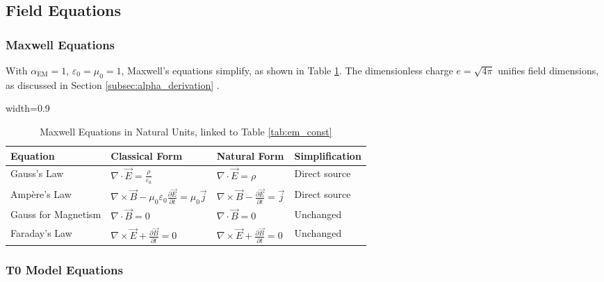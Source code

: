 \documentclass[12pt,a4paper]{article}
\newcommand{\alphaEM}{\alpha_{\text{EM}}}
\newcommand{\tablescale}{0.9}
\begin{document}
	\subsection{Field Equations}
	\label{sec:field_equations}
	
	\subsubsection{Maxwell Equations}
	\label{subsec:maxwell}
	
	With \(\alphaEM = 1\), \(\varepsilon_0 = \mu_0 = 1\), Maxwell’s equations simplify, as shown in Table \ref{tab:maxwell}. The dimensionless charge \(e = \sqrt{4\pi}\) unifies field dimensions, as discussed in Section \ref{subsec:alpha_derivation} \cite{pascher_alpha_2025}.
	
	\begin{table}[htbp]
		\centering
		\begin{adjustbox}{width=\tablescale\textwidth}
			\begin{tabular}{llll}
				\toprule
				\textbf{Equation} & \textbf{Classical Form} & \textbf{Natural Form} & \textbf{Simplification} \\
				\midrule
				Gauss’s Law & \(\nabla \cdot \vec{E} = \frac{\rho}{\varepsilon_0}\) & \(\nabla \cdot \vec{E} = \rho\) & Direct source \\
				Ampère’s Law & \(\nabla \times \vec{B} - \mu_0 \varepsilon_0 \frac{\partial \vec{E}}{\partial t} = \mu_0 \vec{j}\) & \(\nabla \times \vec{B} - \frac{\partial \vec{E}}{\partial t} = \vec{j}\) & Direct source \\
				Gauss for Magnetism & \(\nabla \cdot \vec{B} = 0\) & \(\nabla \cdot \vec{B} = 0\) & Unchanged \\
				Faraday’s Law & \(\nabla \times \vec{E} + \frac{\partial \vec{B}}{\partial t} = 0\) & \(\nabla \times \vec{E} + \frac{\partial \vec{B}}{\partial t} = 0\) & Unchanged \\
				\bottomrule
			\end{tabular}
		\end{adjustbox}
		\caption{Maxwell Equations in Natural Units, linked to Table \ref{tab:em_const}}
		\label{tab:maxwell}
	\end{table}
	
	\subsubsection{T0 Model Equations}
	\label{subsec:t0_equations}
	
\end{document}
